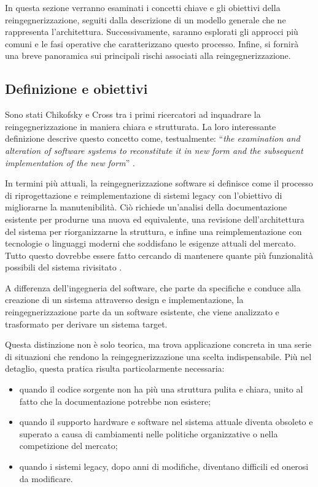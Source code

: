 In questa sezione verranno esaminati i concetti chiave e gli obiettivi della reingegnerizzazione, seguiti dalla descrizione di un modello generale che ne rappresenta l'architettura. Successivamente, saranno esplorati gli approcci più comuni e le fasi operative che caratterizzano questo processo. Infine, si fornirà una breve panoramica sui principali rischi associati alla reingegnerizzazione.

\subsection{Definizione e obiettivi}
Sono stati Chikofsky e Cross tra i primi ricercatori ad inquadrare la reingegnerizzazione in maniera chiara e strutturata. La loro interessante definizione descrive questo concetto come, testualmente: ``\textit{the examination and alteration of software systems to reconstitute it in new form and the subsequent implementation of the new form}'' \cite{Chikofsky1990}.

In termini più attuali, la reingegnerizzazione software si definisce come il processo di riprogettazione e reimplementazione di sistemi legacy con l'obiettivo di migliorarne la manutenibilità. Ciò richiede un'analisi della documentazione esistente per produrne una nuova ed equivalente, una revisione dell'architettura del sistema per riorganizzarne la struttura, e infine una reimplementazione con tecnologie o linguaggi moderni che soddisfano le esigenze attuali del mercato. Tutto questo dovrebbe essere fatto cercando di mantenere quante più funzionalità possibili del sistema rivisitato \cite{sommerville2011software}.

A differenza dell'ingegneria del software, che parte da specifiche e conduce alla creazione di un sistema attraverso design e implementazione, la reingegnerizzazione parte da un software esistente, che viene analizzato e trasformato per derivare un sistema target.

Questa distinzione non è solo teorica, ma trova applicazione concreta in una serie di situazioni che rendono la reingegnerizzazione una scelta indispensabile. Più nel detaglio, questa pratica risulta particolarmente necessaria:
\begin{itemize}
  \item quando il codice sorgente non ha più una struttura pulita e chiara, unito al fatto che la documentazione potrebbe non esistere;
  \item quando il supporto hardware e software nel sistema attuale diventa obsoleto e superato a causa di cambiamenti nelle politiche organizzative o nella competizione del mercato;
  \item quando i sistemi legacy, dopo anni di modifiche, diventano difficili ed onerosi da modificare.
\end{itemize}

